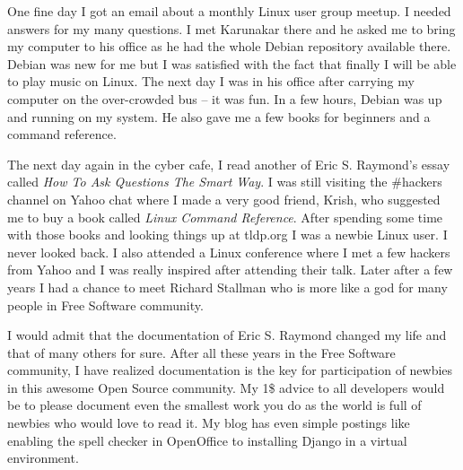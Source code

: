 One fine day I got an email about a monthly Linux user group meetup. I
needed answers for my many questions. I met Karunakar there and he
asked me to bring my computer to his office as he had the whole Debian
repository available there. Debian was new for me but I was
satisfied with the fact that finally I will be able to play music on
Linux. The next day I was in his office after carrying my computer on the
over-crowded bus -- it was fun. In a few hours, Debian was up and running on my
system. He also gave me a few books for beginners and a command reference.

The next day again in the cyber cafe, I read another of Eric S. Raymond's essay
called \textit{How To Ask Questions The Smart Way}. I was still visiting the \#hackers channel on
Yahoo chat where I made a very good friend, Krish, who suggested me to
buy a book called \textit{Linux Command Reference}. After spending some time
with those books and looking things up at tldp.org I was a newbie
Linux user. I never looked back. I also attended a Linux conference
where I met a few hackers from Yahoo and I was really inspired after
attending their talk. Later after a few years I had a chance to meet Richard Stallman
who is more like a god for many people in Free Software community.

I would admit that the documentation of Eric S. Raymond changed my life and that of
many others for sure. After all these years in the Free Software
community, I have realized documentation is the key for participation
of newbies in this awesome Open Source community. My 1\$ advice to all
developers would be to please document even the smallest work you do as the world
is full of newbies who would love to read it. My blog has even simple
postings like enabling the spell checker in OpenOffice to installing Django
in a virtual environment.
